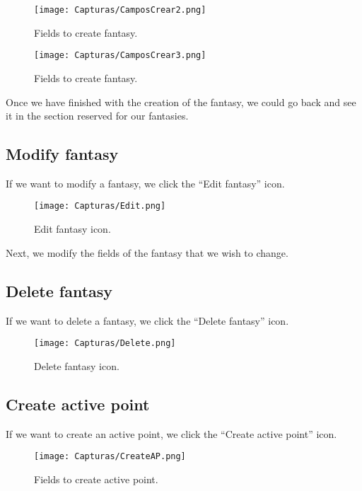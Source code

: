\documentclass{book}
\begin{document}
\begin{figure}[h]
	\centering
	\texttt{[image: Capturas/CamposCrear2.png]}
	\caption{Fields to create fantasy.}
	\label{Fields to create fantasy2}
\end{figure}
\newpage

\begin{figure}[h]
	\centering
	\texttt{[image: Capturas/CamposCrear3.png]}
	\caption{Fields to create fantasy.}
	\label{Fields to create fantasy3}
\end{figure}

Once we have finished with the creation of the fantasy, we could go back and see it in the section reserved for our fantasies.

\subsection{Modify fantasy}
If we want to modify a fantasy, we click the ``Edit fantasy'' icon.

\begin{figure}[h]
	\centering
	\texttt{[image: Capturas/Edit.png]}
	\caption{Edit fantasy icon.}
	\label{Edit fantasy icon}
\end{figure}

Next, we modify the fields of the fantasy that we wish to change.


\subsection{Delete fantasy}
If we want to delete a fantasy, we click the ``Delete fantasy'' icon.

\begin{figure}[h]
	\centering
	\texttt{[image: Capturas/Delete.png]}
	\caption{Delete fantasy icon.}
	\label{Delete fantasy icon}
\end{figure}


\newpage
\subsection{Create active point}
If we want to create an active point, we click the ``Create active point'' icon.

\begin{figure}[h]
	\centering
	\texttt{[image: Capturas/CreateAP.png]}
	\caption{Fields to create active point.}
	\label{Fields to create AP1}
\end{figure}
\end{document}

